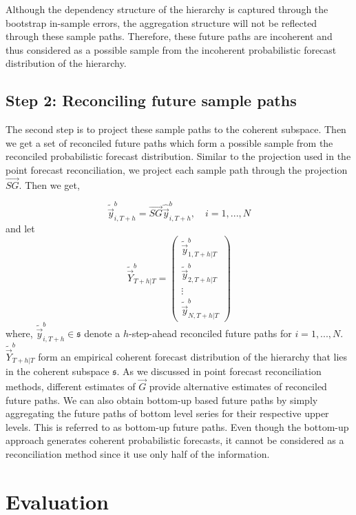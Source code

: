 \documentclass[graybox]{svmult}
\begin{document}
Although the dependency structure of the hierarchy is captured through the bootstrap in-sample errors, the aggregation structure will not be reflected through these sample paths. Therefore, these future paths are incoherent and thus considered as a possible sample from the incoherent probabilistic forecast distribution of the hierarchy.

\subsection*{Step 2: Reconciling future sample paths}

The second step is to project these sample paths to the coherent subspace. Then we get a set of reconciled future paths which form a possible sample from the reconciled probabilistic forecast distribution. Similar to the projection used in the point forecast reconciliation, we project each sample path through the projection $\vec{SG}$. Then we get, 

\begin{equation} \label{eq:20}
\tilde{\vec{y}}_{i,T+h}^b = \vec{SG}\hat{\vec{y}}_{i,T+h}^b, \quad i = 1, ..., N
\end{equation}
and let
\begin{equation}\label{eq:21}
\tilde{\vec{Y}}^b_{T+h|T}=\begin{pmatrix}
\tilde{\vec{y}}_{1,T+h|T}^b\\
\tilde{\vec{y}}_{2,T+h|T}^b\\
\vdots\\
\tilde{\vec{y}}_{N,T+h|T}^b
\end{pmatrix}
\end{equation}
where, $\tilde{\vec{y}}_{i,T+h}^b \in \mathfrak{s}$ denote a $h$-step-ahead reconciled future paths for $i=1,...,N$. $\tilde{\vec{Y}}^b_{T+h|T}$ form an empirical coherent forecast distribution of the hierarchy that lies in the coherent subspace $\mathfrak{s}$. As we discussed in point forecast reconciliation methods, different estimates of $\vec{G}$ provide alternative estimates of reconciled future paths. We can also obtain bottom-up based future paths by simply aggregating the future paths of bottom level series for their respective upper levels. This is referred to as bottom-up future paths. Even though the bottom-up approach generates coherent probabilistic forecasts, it cannot be considered as a reconciliation method since it use only half of the information.

 
\section{Evaluation}
\end{document}
